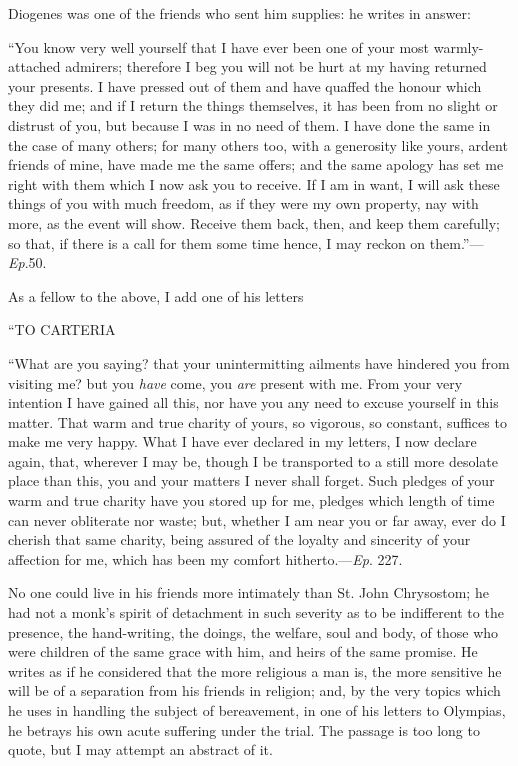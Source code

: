 Diogenes was one of the friends who sent him supplies: he writes in
answer:

``You know very well yourself that I have ever been one of your
most warmly-attached admirers; therefore I beg you will not be hurt at
my having returned your presents. I have pressed out of them and have
quaffed the honour which they did me; and if I return the things
themselves, it has been from no slight or distrust of you, but because
I was in no need of them. I have done the same in the case of many
others; for many others too, with a generosity like yours, ardent
friends of mine, have made me the same offers; and the same apology
has set me right with them which I now ask you to receive. If I am in
want, I will ask these things of you with much freedom, as if they
were my own property, nay with more, as the event will show. Receive
them back, then, and keep them carefully; so that, if there is a call
for them some time hence, I may reckon on them.''—\emph{Ep}.50.

As a fellow to the above, I add one of his letters

``TO
CARTERIA

``What are you saying? that your unintermitting ailments have
hindered you from visiting me? but you \emph{have} come, you \emph{are}
present with me. From your very intention I have gained all this, nor
have you any need to excuse yourself in this matter. That warm and
true charity of yours, so vigorous, so constant, suffices to make me
very happy. What I have ever declared in my letters, I now declare
again, that, wherever I may be, though I be transported to a still
more desolate place than this, you and your matters I never shall
forget. Such pledges of your warm and true charity have you stored up
for me, pledges which length of time can never obliterate nor waste;
but, whether I am near you or far away, ever do I cherish that same
charity, being assured of the loyalty and sincerity of your affection
for me, which has been my comfort hitherto.—\emph{Ep}. 227.

No one could live in his friends more intimately than St. John
Chrysostom; he had not a monk's spirit of detachment in such severity
as to be indifferent to the presence, the hand-writing, the doings,
the welfare, soul and body, of those who were children of the same
grace with him, and heirs of the same promise. He writes as if he
considered that the more religious a man is, the more sensitive he
will be of a separation from his friends in religion; and, by the very
topics which he uses in handling the subject of bereavement, in one of
his letters to Olympias, he betrays his own acute suffering under the
trial. The passage is too long to quote, but I may attempt an abstract
of it.

